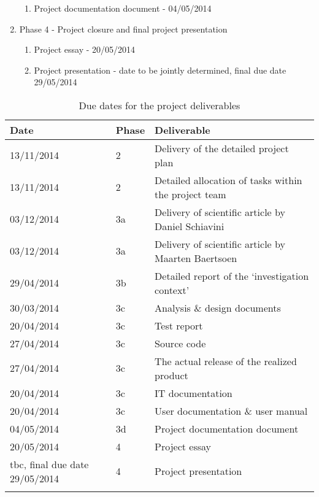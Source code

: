 \begin{enumerate}
 	\begin{enumerate}
		\item Project documentation document				- 	04/05/2014
	\end {enumerate}
	\item Phase 4 - Project closure and final project presentation
 	\begin{enumerate}
		\item Project essay							- 	20/05/2014
		\item Project presentation						- 	date to be jointly determined, final due date 29/05/2014
	\end {enumerate}
\end {enumerate}

\begin{center}
    \begin{longtable}{ | p{3cm} | l |  p{7cm} |}
    \hline
    	\textbf{Date} & \textbf{Phase} & \textbf{Deliverable} \\ 
    	\endhead
    \hline
    	13/11/2014 & 2 & Delivery of the detailed project plan \\ 
    \hline
    	13/11/2014 & 2 & Detailed allocation of tasks within the project team \\ 
    \hline
    	03/12/2014 & 3a & Delivery of scientific article by Daniel Schiavini \\ 
    \hline
    	03/12/2014 & 3a & Delivery of scientific article by Maarten Baertsoen \\ 
    \hline
    	29/04/2014 & 3b & Detailed report of the `investigation context'  \\ 
    \hline
  	 30/03/2014 & 3c & Analysis \& design documents \\ 
    \hline
   	20/04/2014 & 3c & Test report \\ 
    \hline
  	27/04/2014 & 3c & Source code \\ 
    \hline
  	27/04/2014 & 3c & The actual release of the realized product \\ 
    \hline
  	20/04/2014 & 3c &  IT documentation   \\ 
    \hline
  	20/04/2014 & 3c & User documentation \& user manual  \\ 
    \hline
  	04/05/2014 & 3d & Project documentation document \\ 
    \hline
  	20/05/2014 & 4 & Project essay \\ 
    \hline
	\dict{TBC}{To be confirmed}%
 	tbc, final due date 29/05/2014 & 4 & Project presentation	 \\ 
    \hline
    \caption{Due dates for the project deliverables}
    \label{tab:deliverables}
    \end{longtable}
\end{center}

